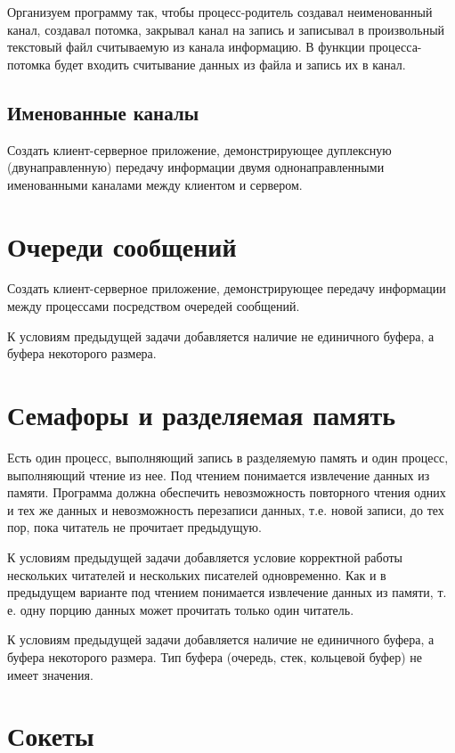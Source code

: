 Организуем программу  так, чтобы процесс-родитель создавал неименованный канал, создавал потомка, закрывал канал на запись и записывал в произвольный текстовый файл считываемую из канала информацию. В функции процесса-потомка будет входить считывание данных из файла и запись их в канал.

\subsection{Именованные каналы}

Создать клиент-серверное приложение, демонстрирующее дуплексную (двунаправленную) передачу информации двумя однонаправленными именованными каналами между клиентом и сервером.

\section{Очереди сообщений}

Создать клиент-серверное приложение, демонстрирующее передачу информации между процессами посредством очередей сообщений.

К условиям предыдущей задачи добавляется наличие не единичного буфера, а буфера некоторого размера.

\section{Семафоры и разделяемая память}

Есть один процесс, выполняющий запись в разделяемую память и один процесс, выполняющий чтение из нее. Под чтением понимается извлечение данных из памяти. Программа должна обеспечить невозможность повторного чтения одних и тех же данных и невозможность перезаписи данных, т.е. новой записи, до тех пор, пока читатель не прочитает предыдущую.

К условиям предыдущей задачи добавляется условие корректной работы нескольких читателей и нескольких писателей одновременно. Как и в предыдущем варианте под чтением понимается извлечение данных из памяти, т. е. одну порцию данных может прочитать только один читатель.

К условиям предыдущей задачи добавляется наличие не единичного буфера, а буфера некоторого размера. Тип буфера (очередь, стек, кольцевой буфер) не имеет значения.

\section{Сокеты}

